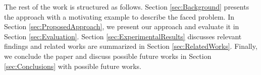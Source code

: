 The rest of the work is structured as follows.  Section \ref{sec:Background} presents the \MNB approach with a motivating example to describe the faced problem. In Section \ref{sec:ProposedApproach}, we present our approach and evaluate it in Section \ref{sec:Evaluation}. Section \ref{sec:ExperimentalResults} discusses relevant findings and related works are summarized in  Section \ref{sec:RelatedWorks}. Finally, we conclude the paper and discuss possible future works in Section \ref{sec:Conclusions} with possible future works.

